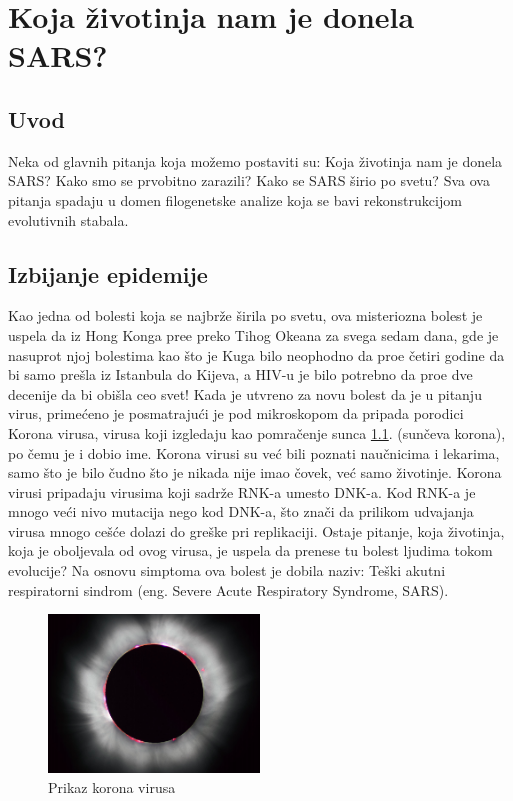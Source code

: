 \chapter{Koja \v{z}ivotinja nam je donela SARS?}
\setbookcodestyle

\section{Uvod}
\label{sec:uvod}

Neka od glavnih pitanja koja mo\v{z}emo postaviti su:
Koja \v{z}ivotinja nam je donela SARS? Kako smo se prvobitno zarazili? Kako se SARS \v{s}irio po svetu? Sva ova pitanja spadaju u domen filogenetske analize koja se bavi rekonstrukcijom evolutivnih stabala.

\section{Izbijanje epidemije}
\label{sec:izbijanjeepidemije}

Kao jedna od bolesti koja se najbr\v{z}e \v{s}irila po svetu, ova misteriozna bolest je uspela da iz Hong Konga pre\dj e preko Tihog Okeana za svega sedam dana, gde je nasuprot njoj bolestima kao \v{s}to je Kuga bilo neophodno da pro\dj e \v{c}etiri godine da bi samo pre\v{s}la iz Istanbula do Kijeva, a HIV-u je bilo potrebno da pro\dj e dve decenije da bi obi\v{s}la ceo svet! Kada je utvr\dj eno za novu bolest da je u pitanju virus, prime\'ceno je posmatraju\'ci je pod mikroskopom da pripada porodici Korona virusa, virusa koji izgledaju kao pomra\v{c}enje sunca \ref{fig:pkv}. (sun\v{c}eva korona), po \v{c}emu je i dobio ime. Korona virusi su ve\'c bili poznati nau\v{c}nicima i lekarima, samo \v{s}to je bilo \v{c}udno \v{s}to je nikada nije imao \v{c}ovek, ve\'c samo \v{z}ivotinje. Korona virusi pripadaju virusima koji sadr\v{z}e RNK-a umesto DNK-a. Kod RNK-a je mnogo ve\'ci nivo mutacija nego kod DNK-a, \v{s}to zna\v{c}i da prilikom udvajanja virusa mnogo ce\v{s}\'ce dolazi do gre\v{s}ke pri replikaciji. Ostaje pitanje, koja \v{z}ivotinja, koja je oboljevala od ovog virusa, je uspela da prenese tu bolest ljudima tokom evolucije? Na osnovu simptoma ova bolest je dobila naziv: Te\v{s}ki akutni respiratorni sindrom (eng. Severe Acute Respiratory Syndrome, SARS). 

\begin{figure}[h!]
\begin{center}
\includegraphics[width=0.5\textwidth]{poglavlja/7/slike/slika1.png}
\end{center}
\caption{Prikaz korona virusa}
\label{fig:pkv}
\end{figure}

